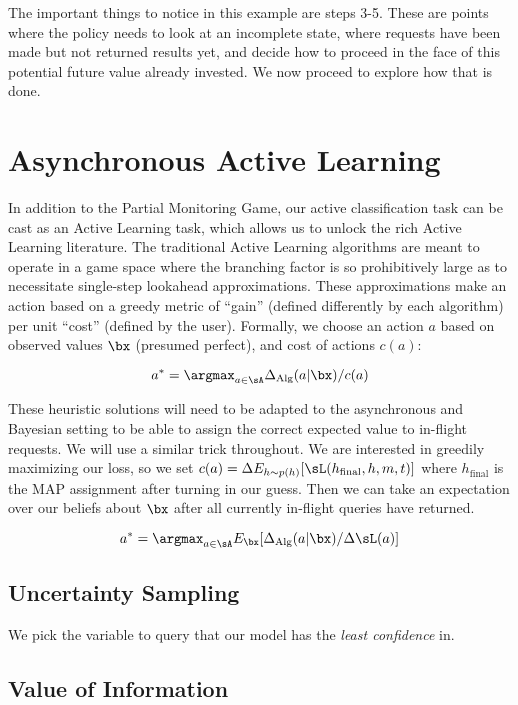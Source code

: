 The important things to notice in this example are steps 3-5.
 These are points where the policy needs to look at an incomplete state, where requests have been made but not returned results yet, and decide how to proceed in the face of this potential future value already invested.
 We now proceed to explore how that is done.

\section{Asynchronous Active Learning}

In addition to the Partial Monitoring Game, our active classification task can be cast as an Active Learning task, which allows us to unlock the rich Active Learning literature.
 The traditional Active Learning algorithms are meant to operate in a game space where the branching factor is so prohibitively large as to necessitate single-step lookahead approximations.
 These approximations make an action based on a greedy metric of ``gain'' (defined differently by each algorithm) per unit ``cost'' (defined by the user).
 Formally, we choose an action $a$ based on observed values $\bx$ (presumed perfect), and cost of actions $c(a)$:

\[a^* = \argmax_{a \in \sA} \Delta_{\text{Alg}}(a | \bx) / c(a)\]

These heuristic solutions will need to be adapted to the asynchronous and Bayesian setting to be able to assign the correct expected value to in-flight requests.
 We will use a similar trick throughout.
 We are interested in greedily maximizing our loss, so we set $c(a) = \Delta E_{h \sim p(h)}[\sL(h_{\text{final}}, h, m, t)]$ where $h_{\text{final}}$ is the MAP assignment after turning in our guess.
 Then we can take an expectation over our beliefs about $\bx$ after all currently in-flight queries have returned.

\[a^* = \argmax_{a \in \sA} E_{\bx}[ \Delta_{\text{Alg}}(a | \bx) / \Delta \sL(a)]\]

\subsection{Uncertainty Sampling}

We pick the variable to query that our model has the \textit{least confidence} in.

\subsection{Value of Information}
